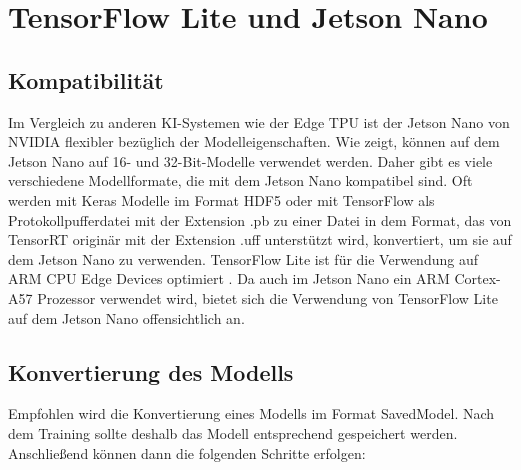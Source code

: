 %
%
%



\section{TensorFlow Lite und Jetson Nano}


\subsection{Kompatibilität}
Im Vergleich zu anderen KI-Systemen wie der Edge TPU ist der Jetson Nano von NVIDIA flexibler bezüglich der Modelleigenschaften. Wie \cite{Stock.07.01.2021} zeigt, können auf dem Jetson Nano auf 16- und 32-Bit-Modelle verwendet werden. Daher gibt es viele verschiedene Modellformate, die mit dem Jetson Nano kompatibel sind. Oft werden  mit Keras Modelle im Format HDF5 oder mit TensorFlow als Protokollpufferdatei mit der Extension .pb zu einer Datei in dem Format, das von TensorRT originär mit der Extension .uff unterstützt wird, konvertiert, um sie auf dem Jetson Nano zu verwenden. %
TensorFlow Lite ist für die Verwendung auf ARM CPU Edge Devices optimiert \cite{Jain:2020}. Da auch im Jetson Nano ein ARM Cortex-A57 Prozessor verwendet wird, bietet sich die Verwendung von TensorFlow Lite auf dem Jetson Nano offensichtlich an.

\subsection{Konvertierung des Modells}

Empfohlen wird die Konvertierung eines Modells im Format SavedModel. Nach dem Training sollte deshalb das Modell entsprechend gespeichert werden. Anschließend können dann die folgenden Schritte erfolgen:

\medskip


    



